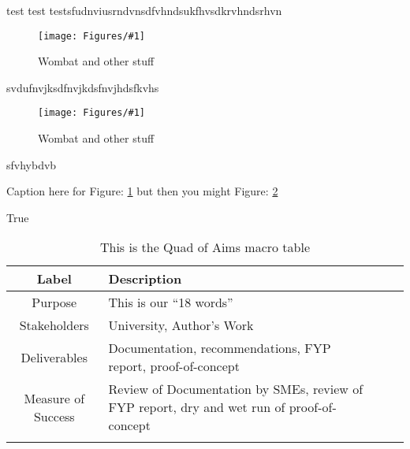 \documentclass{article}
\newcommand{\fref}[1]
{
	Figure: \ref{#1}
}
\newcommand{\myplot}[2]{
	\begin{figure}
		\centering
		\texttt{[image: Figures/\#1]}  
		\caption{#2}
		\label{#1}
	\end{figure}
}
\newcommand{\mytable}[4]{
    \begin{table}[h]
        \begin{center}
            \caption{#2}\label{tab:#1}
            {\footnotesize
                \begin{tabular}{c l l l|}
                    \hline\hline #3 \hline 
                    #4
                    \\ \hline
                \end{tabular}
            }
        \end{center}
    \end{table}
}
\begin{document}
test test testsfudnviusrndvnsdfvhndsukfhvsdkrvhndsrhvn
\myplot{n2analysis.PNG}{Wombat and other stuff}

svdufnvjksdfnvjkdsfnvjhdsfkvhs

\myplot{InputOutput.PNG}{Wombat and other stuff}
sfvhybdvb

Caption here for \fref{n2analysis.PNG} but then you might \fref{InputOutput.PNG}

True \cite{TFwebsite2}

\mytable{QuadOfAims}{This is the Quad of Aims macro table}{Label & Description \\ }{
Purpose & This is our “18 words” \\
Stakeholders & University, Author’s Work \\
Deliverables & Documentation, recommendations, FYP report, proof-of-concept \\
Measure of Success & Review of Documentation by SMEs, review of FYP report, dry and wet run of proof-of-concept \\}



\end{document}
